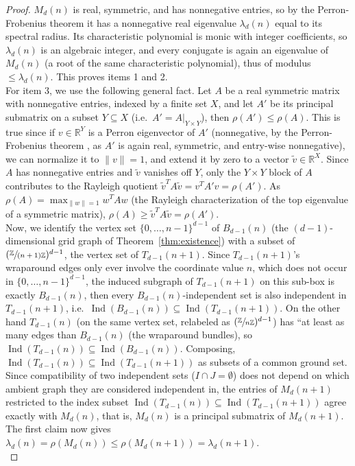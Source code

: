 \documentclass{article}
\theoremstyle{plain}
\theoremstyle{definition}
\theoremstyle{remark}
\newcommand{\Z}{\mathbb{Z}}
\newcommand{\R}{\mathbb{R}}
\newcommand{\quot}[2]{\sfrac{#1}{#2}}
\DeclareMathOperator{\Ind}{Ind}
\begin{document}
\begin{proof}
$M_d(n)$ is real, symmetric, and has nonnegative entries, so by the Perron-Frobenius theorem \cite[Ch.~8]{HornJohnson} it has a nonnegative real eigenvalue $\lambda_d(n)$ equal to its spectral radius. Its characteristic polynomial is monic with integer coefficients, so $\lambda_d(n)$ is an algebraic integer, and every conjugate is again an eigenvalue of $M_d(n)$ (a root of the same characteristic polynomial), thus of modulus $\le\lambda_d(n)$. This proves items 1 and 2.\\

For item 3, we use the following general fact. Let $A$ be a real symmetric matrix with nonnegative entries, indexed by a finite set $X$, and let $A'$ be its principal submatrix on a subset $Y\subseteq X$ (i.e.\ $A'=A|_{Y\times Y}$), then $\rho(A')\le\rho(A)$. This is true since if $v\in\R^Y$ is a Perron eigenvector of $A'$ (nonnegative, by the Perron-Frobenius theorem \cite[Ch.~8]{HornJohnson}, as $A'$ is again real, symmetric, and entry-wise nonnegative), we can normalize it to $\|v\|=1$, and extend it by zero to a vector $\tilde v\in\R^X$. Since $A$ has nonnegative entries and $\tilde v$ vanishes off $Y$, only the $Y\times Y$ block of $A$ contributes to the Rayleigh quotient $\tilde v^TA\tilde v=v^TA'v=\rho(A')$. As $\rho(A)=\max_{\|w\|=1}w^TAw$ (the Rayleigh characterization of the top eigenvalue of a symmetric matrix), $\rho(A)\ge\tilde v^TA\tilde v=\rho(A')$.\\

Now, we identify the vertex set $\{0,\dots,n-1\}^{d-1}$ of $B_{d-1}(n)$ (the $(d-1)$-dimensional grid graph of Theorem~\ref{thm:existence}) with a subset of $(\sfrac{\Z}{(n+1)\Z})^{d-1}$, the vertex set of $T_{d-1}(n+1)$. Since $T_{d-1}(n+1)$'s wraparound edges only ever involve the coordinate value $n$, which does not occur in $\{0,\dots,n-1\}^{d-1}$, the induced subgraph of $T_{d-1}(n+1)$ on this sub-box is exactly $B_{d-1}(n)$, then every $B_{d-1}(n)$-independent set is also independent in $T_{d-1}(n+1)$, i.e.\ $\Ind(B_{d-1}(n))\subseteq\Ind(T_{d-1}(n+1))$. On the other hand $T_{d-1}(n)$ (on the same vertex set, relabeled as $(\quot{\Z}{n\Z})^{d-1}$) has “at least as many edges than $B_{d-1}(n)$ (the wraparound bundles), so $\Ind(T_{d-1}(n))\subseteq\Ind(B_{d-1}(n))$. Composing, $\Ind(T_{d-1}(n))\subseteq\Ind(T_{d-1}(n+1))$ as subsets of a common ground set. Since compatibility of two independent sets ($I\cap J=\emptyset$) does not depend on which ambient graph they are considered independent in, the entries of $M_d(n+1)$ restricted to the index subset $\Ind(T_{d-1}(n))\subseteq\Ind(T_{d-1}(n+1))$ agree exactly with $M_d(n)$, that is, $M_d(n)$ is a principal submatrix of $M_d(n+1)$. The first claim now gives $\lambda_d(n)=\rho(M_d(n))\le\rho(M_d(n+1))=\lambda_d(n+1)$.\\


\end{proof}
\end{document}
